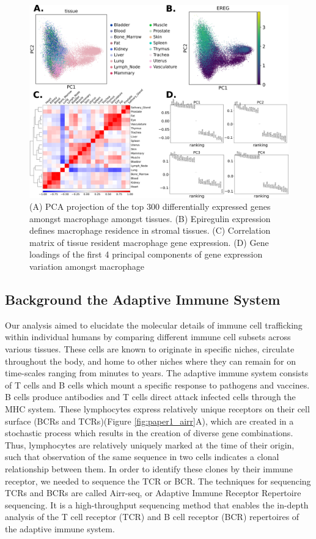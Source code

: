 \begin{figure}[hbt!]
\centering
\includegraphics[width=14cm, keepaspectratio]{figs/paper1/fig1_gex_analysis.png}
\caption[Gene Expression Analysis of Tissue Resident Macrophage]{(A) PCA projection of the top 300 differentially expressed genes amongst macrophage amongst tissues. (B) Epiregulin expression defines macrophage residence in stromal tissues. (C) Correlation matrix of tissue resident macrophage gene expression. (D) Gene loadings of the first 4 principal components of gene expression variation amongst macrophage}
\label{fig:paper1_gex}
\end{figure}

\subsection{Background the Adaptive Immune System}
Our analysis aimed to elucidate the molecular details of immune cell trafficking within individual humans by comparing different immune cell subsets across various tissues. These cells are known to originate in specific niches, circulate throughout the body, and home to other niches where they can remain for on time-scales ranging from minutes\cite{jerison_heterogeneous_2020} to years\cite{hammarlund_plasma_2017}. The adaptive immune system consists of T cells and B cells which mount a specific response to pathogens and vaccines. B cells produce antibodies and T cells direct attack infected cells through the MHC system. These lymphocytes express relatively unique receptors on their cell surface (BCRs and TCRs)(Figure \ref{fig:paper1_airr}A), which are created in a stochastic process which results in the creation of diverse gene combinations\cite{alberts2017molecular}. Thus, lymphocytes are relatively uniquely marked at the time of their origin, such that observation of the same sequence in two cells indicates a clonal relationship between them. In order to identify these clones by their immune receptor, we needed to sequence the TCR or BCR. The techniques for sequencing TCRs and BCRs are called Airr-seq, or Adaptive Immune Receptor Repertoire sequencing. It is a high-throughput sequencing method that enables the in-depth analysis of the T cell receptor (TCR) and B cell receptor (BCR) repertoires of the adaptive immune system. 

